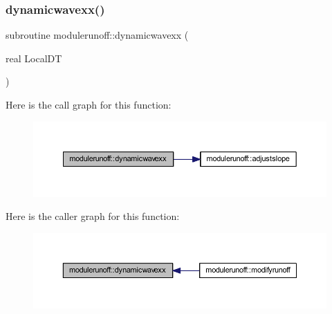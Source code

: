 \mbox{\label{namespacemodulerunoff_a18db45ec88a4cf69a97c7b95648bc264}} 
\subsubsection{\texorpdfstring{dynamicwavexx()}{dynamicwavexx()}}
{\footnotesize\ttfamily subroutine modulerunoff\+::dynamicwavexx (\begin{DoxyParamCaption}\item[{real}]{Local\+DT }\end{DoxyParamCaption})\hspace{0.3cm}{\ttfamily [private]}}

Here is the call graph for this function\+:\nopagebreak
\begin{figure}[H]
\begin{center}
\leavevmode
\includegraphics[width=350pt]{namespacemodulerunoff_a18db45ec88a4cf69a97c7b95648bc264_cgraph}
\end{center}
\end{figure}
Here is the caller graph for this function\+:\nopagebreak
\begin{figure}[H]
\begin{center}
\leavevmode
\includegraphics[width=350pt]{namespacemodulerunoff_a18db45ec88a4cf69a97c7b95648bc264_icgraph}
\end{center}
\end{figure}
\mbox{\label{namespacemodulerunoff_a86d4b0ce5f4e6efc7d53702b40d97604}} 
